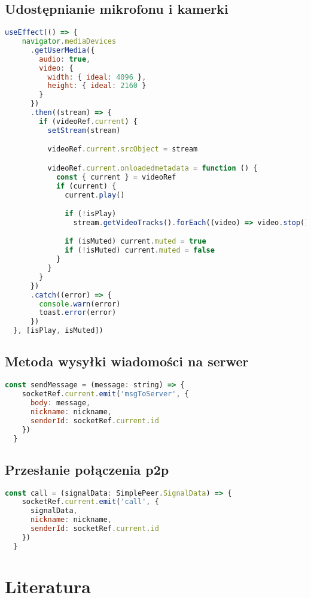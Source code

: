 \documentclass{article}
\begin{document}
\subsection{Udostępnianie mikrofonu i kamerki}
\begin{lstlisting}[language=JavaScript]
  useEffect(() => {
    navigator.mediaDevices
      .getUserMedia({
        audio: true,
        video: {
          width: { ideal: 4096 },
          height: { ideal: 2160 }
        }
      })
      .then((stream) => {
        if (videoRef.current) {
          setStream(stream)

          videoRef.current.srcObject = stream

          videoRef.current.onloadedmetadata = function () {
            const { current } = videoRef
            if (current) {
              current.play()

              if (!isPlay)
                stream.getVideoTracks().forEach((video) => video.stop())

              if (isMuted) current.muted = true
              if (!isMuted) current.muted = false
            }
          }
        }
      })
      .catch((error) => {
        console.warn(error)
        toast.error(error)
      })
  }, [isPlay, isMuted])
\end{lstlisting}

\subsection{Metoda wysyłki wiadomości na serwer}
\begin{lstlisting}[language=JavaScript]
  const sendMessage = (message: string) => {
    socketRef.current.emit('msgToServer', {
      body: message,
      nickname: nickname,
      senderId: socketRef.current.id
    })
  }
\end{lstlisting}

\subsection{Przesłanie połączenia p2p}
\begin{lstlisting}[language=JavaScript]
  const call = (signalData: SimplePeer.SignalData) => {
    socketRef.current.emit('call', {
      signalData,
      nickname: nickname,
      senderId: socketRef.current.id
    })
  }
\end{lstlisting}

\section{Literatura}
\end{document}
